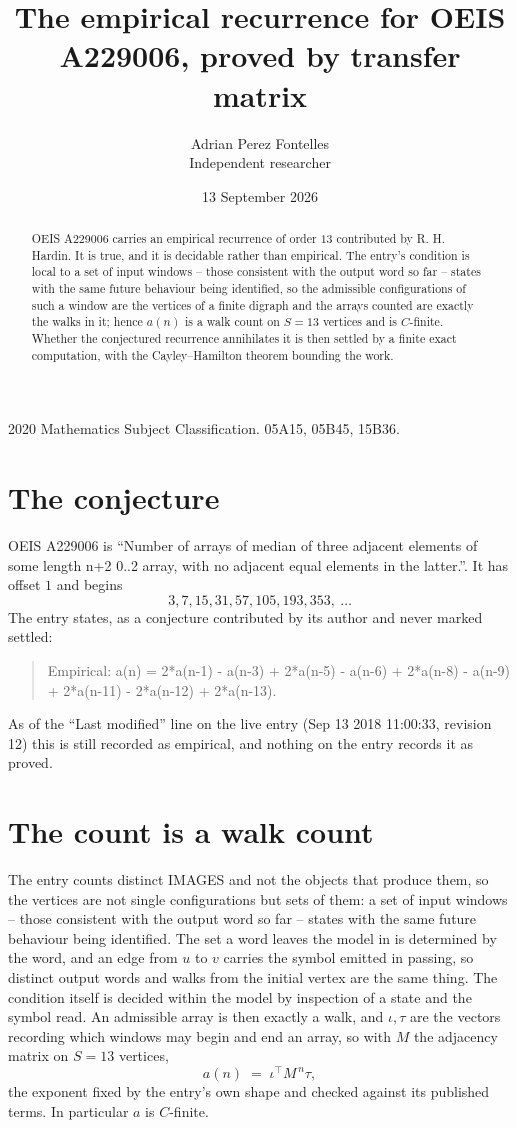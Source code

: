 \documentclass[11pt,a4paper]{article}
\title{The empirical recurrence for OEIS A229006, proved by transfer matrix}
\author{Adrian Perez Fontelles\\ \small Independent researcher}
\date{13 September 2026}
\theoremstyle{plain}
\theoremstyle{definition}
\begin{document}
\maketitle

\begin{abstract}
OEIS A229006 carries an empirical recurrence of order $13$ contributed by R. H. Hardin. It is
true, and it is decidable rather than empirical. The entry's condition is local to a set of input windows -- those consistent with the output word so far -- states with the same future behaviour being identified, so
the admissible configurations of such a window are the vertices of a finite digraph and the
arrays counted are exactly the walks in it; hence $a(n)$ is a walk count on $S=13$ vertices
and is $C$-finite. Whether the conjectured recurrence annihilates it is then settled by a
finite exact computation, with the Cayley--Hamilton theorem bounding the work.
\end{abstract}

\noindent\small 2020 Mathematics Subject Classification. 05A15, 05B45, 15B36.\normalsize

\section{The conjecture}

OEIS A229006 is ``Number of arrays of median of three adjacent elements of some length n+2 0..2 array, with no adjacent equal elements in the latter.''. It has offset $1$ and begins
\[
3, 7, 15, 31, 57, 105, 193, 353,\ \dots
\]
The entry states, as a conjecture contributed by its author and never marked settled:
\begin{quote}
Empirical: a(n) = 2*a(n-1) - a(n-3) + 2*a(n-5) - a(n-6) + 2*a(n-8) - a(n-9) + 2*a(n-11) - 2*a(n-12) + 2*a(n-13).
\end{quote}
As of the ``Last modified'' line on the live entry (Sep 13 2018 11:00:33, revision 12) this is still
recorded as empirical, and nothing on the entry records it as proved.

\section{The count is a walk count}

The entry counts distinct IMAGES and not the objects that produce them, so the vertices are not single configurations but sets of them: a set of input windows -- those consistent with the output word so far -- states with the same future behaviour being identified. The set a word leaves the model in is determined by the word, and an edge from $u$ to $v$ carries the symbol emitted in passing, so distinct output words and walks from the initial vertex are the same thing. The condition itself is decided within the model by inspection of a state and the symbol read.
An admissible array is then exactly a walk, and $\iota,\tau$ are the vectors recording which windows may begin and end an array, so with $M$ the adjacency matrix on $S=13$ vertices,
\[
a(n)\;=\;\iota^{\!\top}M^{\,n}\tau ,
\]
the exponent fixed by the entry's own shape and checked against its published terms. In
particular $a$ is $C$-finite.
\end{document}
